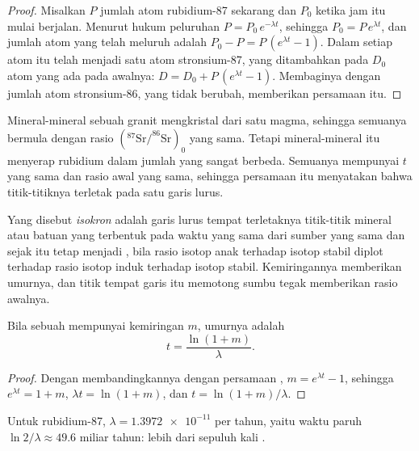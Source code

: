 \begin{proof}
Misalkan $P$ jumlah atom rubidium-87 sekarang dan $P_0$ ketika jam itu mulai
berjalan. Menurut hukum peluruhan $P = P_0\,e^{-\lambda t}$, sehingga $P_0 = P\,e^{\lambda t}$,
dan jumlah atom yang telah meluruh adalah $P_0 - P = P\,(e^{\lambda t}-1)$.
Dalam  setiap atom itu telah menjadi satu atom stronsium-87, yang
ditambahkan pada $D_0$ atom yang ada pada awalnya: $D = D_0 + P\,(e^{\lambda
t}-1)$. Membaginya dengan jumlah atom stronsium-86, yang tidak berubah,
memberikan persamaan itu.
\end{proof}

Mineral-mineral sebuah granit mengkristal dari satu magma, sehingga semuanya
bermula dengan rasio $(^{87}\mathrm{Sr}/^{86}\mathrm{Sr})_0$ yang sama. Tetapi
mineral-mineral itu menyerap rubidium dalam jumlah yang sangat berbeda. Semuanya
mempunyai $t$ yang sama dan rasio awal yang sama, sehingga persamaan itu
menyatakan bahwa titik-titiknya terletak pada satu garis lurus.

\begin{definition}[Isokron]\label{def:g12:age-of-the-earth:isochron}
Yang disebut \emph{isokron} adalah garis lurus tempat terletaknya
titik-titik mineral atau batuan yang terbentuk pada waktu yang sama dari sumber
yang sama dan sejak itu tetap menjadi , bila rasio isotop anak
terhadap isotop stabil diplot terhadap rasio isotop induk terhadap isotop
stabil. Kemiringannya memberikan umurnya, dan titik tempat garis itu memotong
sumbu tegak memberikan rasio awalnya.
\end{definition}

\begin{proposition}\label{prop:g12:age-of-the-earth:slope}
Bila sebuah  mempunyai kemiringan $m$, umurnya adalah
\[
  t = \frac{\ln(1+m)}{\lambda}.
\]
\end{proposition}

\begin{proof}
Dengan membandingkannya dengan persamaan , $m = e^{\lambda t} - 1$, sehingga
$e^{\lambda t} = 1 + m$, $\lambda t = \ln(1+m)$, dan $t = \ln(1+m)/\lambda$.
\end{proof}

Untuk rubidium-87, $\lambda = \num{1.3972e-11}$ per tahun, yaitu waktu paruh
$\ln 2/\lambda \approx 49.6$ miliar tahun: lebih dari sepuluh kali .

